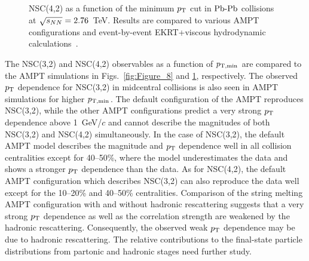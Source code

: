 \begin{figure}[t!]
             \begin{center}
              \end{center}
             \caption{NSC(4,2) as a function of the minimum $p_{\rm T}$ cut in $\textnormal{Pb-Pb}$ collisions at $\sqrt{s_{NN}}=2.76$~TeV. Results are compared to various AMPT configurations and event-by-event EKRT+viscous hydrodynamic calculations~\cite{Niemi:2015qia}.}
             \label{fig:Figure_9}
\end{figure}

The NSC(3,2) and NSC(4,2) observables as a function of $p_{\rm T, min}$ are compared to the {AMPT} simulations in Figs.~\ref{fig:Figure_8} and \ref{fig:Figure_9}, respectively.
The observed $p_{\rm T}$ dependence for NSC(3,2) in midcentral collisions is also seen in AMPT simulations for higher $p_{\rm T, min}$.
The default configuration of the AMPT reproduces NSC(3,2), while the other AMPT configurations predict a very strong $p_{\rm T}$ dependence above 1~GeV/$c$ and cannot describe the magnitudes of both NSC(3,2) and NSC(4,2) simultaneously.
In the case of NSC(3,2), the default AMPT model describes the magnitude and $p_{\rm T}$ dependence well in all collision centralities except for 40--50\%, where the model underestimates the data and shows a stronger $p_{\rm T}$ dependence than the data.
As for  NSC(4,2), the default AMPT configuration which describes NSC(3,2) can also reproduce the data well except for the 10--20\% and 40--50\% centralities.
Comparison of the string melting AMPT configuration with and without hadronic rescattering suggests that a very strong $p_{\rm T}$ dependence as well as the correlation strength are weakened by the hadronic rescattering.
Consequently, the observed weak $p_{\rm T}$ dependence may be due to hadronic rescattering. The relative contributions to the final-state particle distributions from partonic and hadronic stages need further study.

